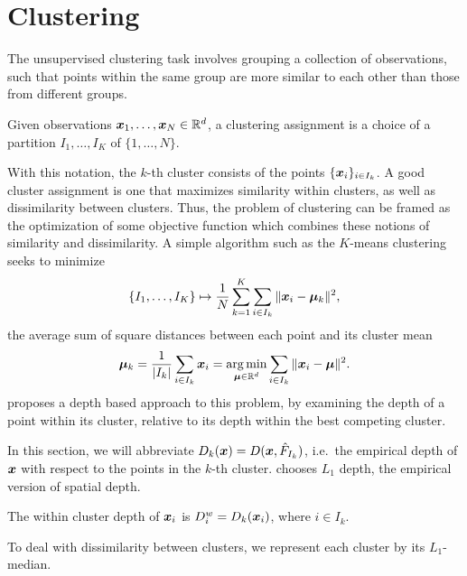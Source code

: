\section{Clustering}
\label{sec:multivariate_clustering}

The unsupervised clustering task involves grouping a collection of
observations, such that points within the same group are more similar to each
other than those from different groups.

\begin{definition}[Clustering]
    Given observations $\bm{x}_1, \dots, \bm{x}_N \in \mathbb{R}^d$, a clustering assignment
    is a choice of a partition $I_1, \dots, I_K$ of $\{1, \dots, N\}$.
\end{definition}

With this notation, the $k$-th cluster consists of the points $\{\bm{x}_i\}_{i
\in I_k}$.
A good cluster assignment is one that maximizes similarity within clusters, as
well as dissimilarity between clusters.
Thus, the problem of clustering can be framed as the optimization of some
objective function which combines these notions of similarity and
dissimilarity.
A simple algorithm such as the $K$-means clustering seeks to minimize
\begin{equation}
    \{I_1, \dots, I_K\} \mapsto \frac{1}{N} \sum_{k = 1}^K \sum_{i \in I_k} \Vert \bm{x}_i - \bm{\mu}_k \Vert^2,
\end{equation}
the average sum of square distances between each point and its cluster mean
\begin{equation}
    \bm{\mu}_k = \frac{1}{|I_k|} \sum_{i \in I_k} \bm{x}_i
    = \operatorname*{arg\,min}_{\bm{\mu} \in \mathbb{R}^d} \sum_{i \in I_k} \Vert \bm{x}_i - \bm{\mu} \Vert^2.
\end{equation}
\textcite{jornsten-2004} proposes a depth based approach to this problem, by
examining the depth of a point within its cluster, relative to its depth
within the best competing cluster.

In this section, we will abbreviate $D_k(\bm{x}) = D(\bm{x}, \hat{F}_{I_k})$, i.e.\
the empirical depth of $\bm{x}$ with respect to the points in the $k$-th cluster.
\textcite{jornsten-2004} chooses $L_1$ depth, the empirical version of spatial
depth.

\begin{definition}
    The within cluster depth of $\bm{x}_i$ is $D_i^w = D_k(\bm{x}_i)$, where $i \in
    I_k$.
\end{definition}

To deal with dissimilarity between clusters, we represent each cluster by its
$L_1$-median.

